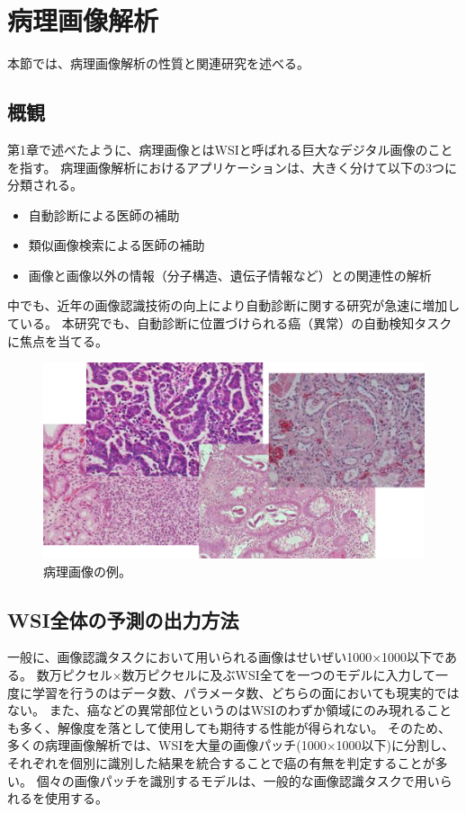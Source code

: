 \section{病理画像解析}
本節では、病理画像解析の性質と関連研究を述べる。

\subsection{概観}
第1章で述べたように、病理画像とはWSIと呼ばれる巨大なデジタル画像のことを指す。
病理画像解析におけるアプリケーションは、大きく分けて以下の3つに分類される\cite{komuraishikawa}。
\begin{itemize}
    \item 自動診断による医師の補助
    \item 類似画像検索による医師の補助
    \item 画像と画像以外の情報（分子構造、遺伝子情報など）との関連性の解析
\end{itemize}
中でも、近年の画像認識技術の向上により自動診断に関する研究が急速に増加している\cite{doyle2008automated,dundar2011computerized}。
本研究でも、自動診断に位置づけられる癌（異常）の自動検知タスクに焦点を当てる。

\begin{figure}[tbp]
    \label{fig:path_images}
     \begin{center}
      \includegraphics[width=13cm]{figures/path_images.png}
     \end{center}
    \caption{病理画像の例。}
\end{figure}
    
\subsection{WSI全体の予測の出力方法}
一般に、画像認識タスクにおいて用いられる画像はせいぜい1000×1000以下である。
数万ピクセル×数万ピクセルに及ぶWSI全てを一つのモデルに入力して一度に学習を行うのはデータ数、パラメータ数、どちらの面においても現実的ではない。
また、癌などの異常部位というのはWSIのわずか領域にのみ現れることも多く、解像度を落として使用しても期待する性能が得られない。
そのため、多くの病理画像解析では、WSIを大量の画像パッチ(1000×1000以下)に分割し、それぞれを個別に識別した結果を統合することで癌の有無を判定することが多い。
個々の画像パッチを識別するモデルは、一般的な画像認識タスクで用いられるを使用する。

